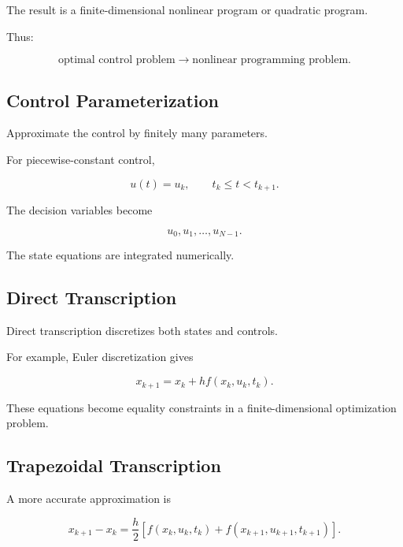 The result is a finite-dimensional nonlinear program or quadratic program.

Thus:

\[
\boxed{
\text{optimal control problem}
\rightarrow
\text{nonlinear programming problem}.
}
\]

\subsection{Control Parameterization}
\label{subsec:control-parameterization}

Approximate the control by finitely many parameters.

For piecewise-constant control,

\[
\boxed{
u(t)
=
u_k,
\qquad
t_k\leq t<t_{k+1}.
}
\]

The decision variables become

\[
\boxed{
u_0,u_1,\ldots,u_{N-1}.
}
\]

The state equations are integrated numerically.

\subsection{Direct Transcription}
\label{subsec:direct-transcription}

Direct transcription discretizes both states and controls.

For example, Euler discretization gives

\[
\boxed{
x_{k+1}
=
x_k
+
h
f(x_k,u_k,t_k).
}
\]

These equations become equality constraints in a finite-dimensional
optimization problem.

\subsection{Trapezoidal Transcription}
\label{subsec:trapezoidal-transcription}

A more accurate approximation is

\[
\boxed{
x_{k+1}
-
x_k
=
\frac{h}{2}
\left[
f(x_k,u_k,t_k)
+
f(x_{k+1},u_{k+1},t_{k+1})
\right].
}
\]

